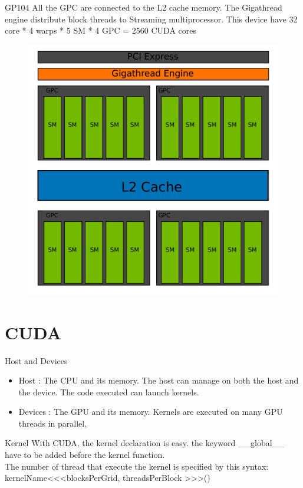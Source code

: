 \documentclass{beamer}
\begin{document}
\begin{frame}{GP104}
	All the GPC are connected to the L2 cache memory. The Gigathread engine distribute block threads to Streaming multiprocessor. This device have 32 core * 4 warps * 5 SM * 4 GPC = 2560 CUDA cores
	\begin{figure}
		\includegraphics[scale=0.3]{figures/gp104.pdf}
	\end{figure}
\end{frame}

\section{CUDA}
\begin{frame}{Host and Devices}
	\begin{itemize}
		\item Host : The CPU and its memory. The host can manage on both the host and the device. The code executed can launch kernels.
		\item Devices : The GPU and its memory. Kernels are executed on many GPU threads in parallel.
	\end{itemize}
\end{frame}

\begin{frame}{Kernel}
	With CUDA, the kernel declaration is easy. the keyword \_\_global\_\_ have to be added before the kernel function.\\
	The number of thread that execute the kernel is specified by this syntax: \\
	kernelName\textless\textless\textless blocksPerGrid, threadsPerBlock \textgreater\textgreater\textgreater()
\end{frame}
\end{document}
